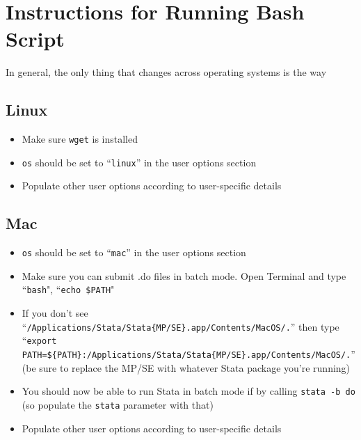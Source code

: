 \documentclass{article}
\begin{document}
\begin{landscape}
\end{landscape}

\newpage
{}
\section{Instructions for Running Bash Script}\label{sec:instructions}
In general, the only thing that changes across operating systems is the way 
\subsection{Linux}
	\begin{itemize}
	\item Make sure {\tt wget} is installed
	\item {\tt os} should be set to ``{\tt linux}'' in the user options section
	\item Populate other user options according to user-specific details
	\end{itemize}
\subsection{Mac}
	\begin{itemize}
	\item {\tt os} should be set to ``{\tt mac}'' in the user options section
	\item Make sure you can submit .do files in batch mode. Open Terminal and type ``{\tt bash}", ``{\tt echo \$PATH}"
	\item If you don't see ``{\tt /Applications/Stata/Stata\{MP/SE\}.app/Contents/MacOS/.}'' then type\\ ``{\tt export 			PATH=\$\{PATH\}:/Applications/Stata/Stata\{MP/SE\}.app/Contents/MacOS/.}'' (be sure to replace the MP/SE with whatever Stata package you're running)
	\item You should now be able to run Stata in batch mode if by calling {\tt stata -b do} (so populate the {\tt stata} parameter with that)
	\item Populate other user options according to user-specific details
	\end{itemize}
\end{document}
